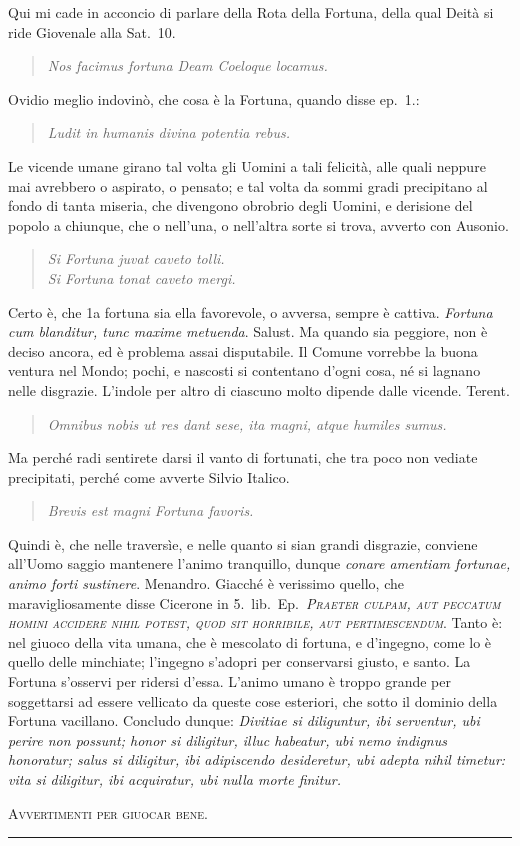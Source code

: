 \documentclass[11pt,a6paper]{article}
\newcommand{\literaryquote}[1]{%
\kern -6pt  \begin{verse}
    {\footnotesize \it #1}
  \end{verse}\kern -2pt%
}
\newcommand{\supersection}[1]{%
\clearpage
    {\scshape \centering \huge #1\\}
    \vspace{6pt}
    \hrule
    \vspace{12pt}
}
\begin{document}
{\footnotesize
Qui mi cade in acconcio di parlare della Rota
della Fortuna, della qual Deità si ride Giovenale
alla Sat.\ 10.

\literaryquote{Nos facimus fortuna Deam Coeloque locamus.}

Ovidio meglio indovinò, che cosa è la Fortuna,
quando disse ep.\ 1.:

\literaryquote{Ludit in humanis divina potentia rebus.}

Le vicende umane girano tal volta gli Uomini
a tali felicità, alle quali neppure mai avrebbero o
aspirato, o pensato; e tal volta da sommi gradi precipitano
al fondo di tanta miseria, che divengono
obrobrio degli Uomini, e derisione del popolo a
chiunque, che o nell'una, o nell'altra sorte si trova,
avverto con Ausonio.

\literaryquote{Si Fortuna juvat caveto tolli. \\
Si Fortuna tonat caveto mergi.}

Certo è, che 1a fortuna sia ella favorevole, o
avversa, sempre è cattiva. \textit{Fortuna cum blanditur,
 tunc maxime metuenda}. Salust. Ma quando sia peggiore,
non è deciso ancora, ed è problema assai disputabile.
Il Comune vorrebbe la buona ventura
nel Mondo; pochi, e nascosti si contentano d'ogni
cosa, né si lagnano nelle disgrazie. L'indole per altro
di ciascuno molto dipende dalle vicende. Terent.

\literaryquote{Omnibus nobis ut res dant sese, ita magni, atque
humiles sumus.}

Ma perché radi sentirete darsi il vanto di fortunati,
che tra poco non vediate precipitati, perché come
avverte Silvio Italico.

\literaryquote{Brevis est magni Fortuna favoris.}

Quindi è, che nelle traversìe, e nelle quanto si sian
grandi disgrazie, conviene all'Uomo saggio mantenere
l'animo tranquillo, dunque \textit{conare amentiam
fortunae, animo forti sustinere}. Menandro. Giacché
è verissimo quello, che maravigliosamente disse
Cicerone in 5.\ lib.\ Ep.\ \textit{\textsc{Praeter culpam, aut peccatum
homini accidere nihil potest, quod sit
horribile, aut pertimescendum}}. Tanto è: nel
giuoco della vita umana, che è mescolato di
fortuna, e d'ingegno, come lo è quello delle minchiate;
l'ingegno s'adopri per conservarsi giusto, e santo.
La Fortuna s'osservi per ridersi d'essa. L'animo
umano è troppo grande per soggettarsi ad essere
vellicato da queste cose esteriori, che sotto il
dominio della Fortuna vacillano. Concludo dunque:
\textit{Divitiae si diliguntur, ibi serventur, ubi perire non
possunt; honor si diligitur, illuc habeatur, ubi nemo
indignus honoratur; salus si diligitur, ibi adipiscendo
desideretur, ubi adepta nihil timetur: vita si
diligitur, ibi acquiratur, ubi nulla morte finitur.}
}
\supersection{Avvertimenti per giuocar bene.}
\end{document}
